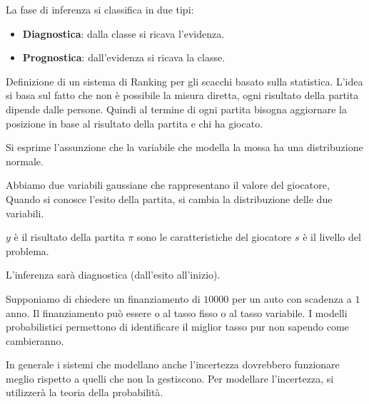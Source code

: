 La fase di inferenza si classifica in due tipi:
\begin{itemize}
    \item \textbf{Diagnostica}: dalla classe si ricava l'evidenza.
    \item \textbf{Prognostica}: dall'evidenza si ricava la classe.
\end{itemize}
\begin{esempio}
    Definizione di un sistema di Ranking per gli scacchi basato sulla statistica.
    L'idea si basa sul fatto che non è possibile la misura diretta, ogni risultato
    della partita dipende dalle persone. Quindi al termine di ogni partita bisogna
    aggiornare la posizione in base al risultato della partita e chi ha giocato.

    Si esprime l'assunzione che la variabile che modella la mossa ha una distribuzione
    normale.

    Abbiamo due variabili gaussiane che rappresentano il valore del giocatore, Quando
    si conosce l'esito della partita, si cambia la distribuzione delle due variabili.

    $y$ è il risultato della partita
    $\pi$ sono le caratteristiche del giocatore
    $s$ è il livello del problema.

    L'inferenza sarà diagnostica (dall'esito all'inizio).
\end{esempio}
\begin{esempio}
    Supponiamo di chiedere un finanziamento di $10000$ per un auto con scadenza
    a $1$ anno. Il finanziamento può essere o al tasso fisso o al tasso variabile.
    I modelli probabilistici permettono di identificare il miglior tasso pur non
    sapendo come cambieranno.
\end{esempio}
In generale i sistemi che modellano anche l'incertezza dovrebbero funzionare meglio
rispetto a quelli che non la gestiscono. Per modellare l'incertezza, si utilizzerà
la teoria della probabilità.

